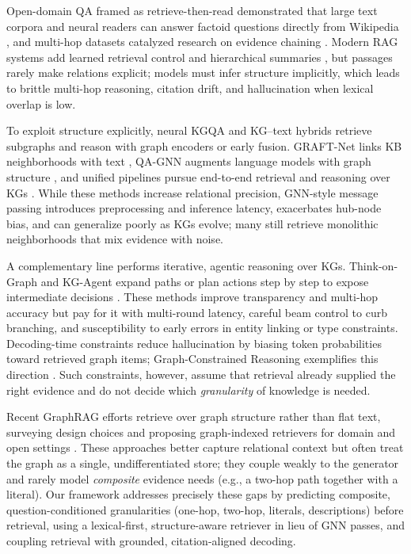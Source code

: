 \documentclass[conference]{IEEEtran}
\begin{document}
Open-domain QA framed as retrieve-then-read demonstrated that large text corpora and neural readers can answer factoid questions directly from Wikipedia \cite{chen2017drqa}, and multi-hop datasets catalyzed research on evidence chaining \cite{yang2018hotpotqa}. Modern RAG systems add learned retrieval control and hierarchical summaries \cite{asai2023selfrag,sarthi2024raptor}, but passages rarely make relations explicit; models must infer structure implicitly, which leads to brittle multi-hop reasoning, citation drift, and hallucination when lexical overlap is low.

To exploit structure explicitly, neural KGQA and KG–text hybrids retrieve subgraphs and reason with graph encoders or early fusion. GRAFT-Net links KB neighborhoods with text \cite{sun2018graftnet}, QA-GNN augments language models with graph structure \cite{yasunaga2021qagnn}, and unified pipelines pursue end-to-end retrieval and reasoning over KGs \cite{jiang2023unikgqa,li2024unioqa}. While these methods increase relational precision, GNN-style message passing introduces preprocessing and inference latency, exacerbates hub-node bias, and can generalize poorly as KGs evolve; many still retrieve monolithic neighborhoods that mix evidence with noise.

A complementary line performs iterative, agentic reasoning over KGs. Think-on-Graph and KG-Agent expand paths or plan actions step by step to expose intermediate decisions \cite{sun2023think,jiang2024kg}. These methods improve transparency and multi-hop accuracy but pay for it with multi-round latency, careful beam control to curb branching, and susceptibility to early errors in entity linking or type constraints. Decoding-time constraints reduce hallucination by biasing token probabilities toward retrieved graph items; Graph-Constrained Reasoning exemplifies this direction \cite{luo2024graph}. Such constraints, however, assume that retrieval already supplied the right evidence and do not decide which \emph{granularity} of knowledge is needed.

Recent GraphRAG efforts retrieve over graph structure rather than flat text, surveying design choices and proposing graph-indexed retrievers for domain and open settings \cite{peng2024graphrag_survey,hu2024grag,chen2024kg_retriever,xu2024ragkg_cs,tian2024kgadapter,avila2024autokgqa}. These approaches better capture relational context but often treat the graph as a single, undifferentiated store; they couple weakly to the generator and rarely model \emph{composite} evidence needs (e.g., a two-hop path together with a literal). Our framework addresses precisely these gaps by predicting composite, question-conditioned granularities (one-hop, two-hop, literals, descriptions) before retrieval, using a lexical-first, structure-aware retriever in lieu of GNN passes, and coupling retrieval with grounded, citation-aligned decoding.
\end{document}
